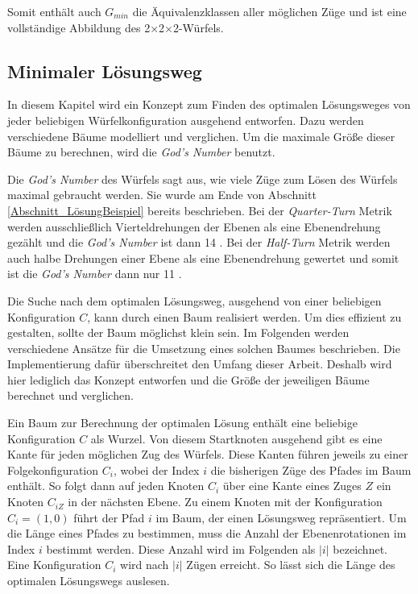 \documentclass[12pt,a4paper, usenames, dvipsnames]{article}
\theoremstyle{mystyle}
\theoremstyle{definition}
\newcommand{\Ttwo}{2$\times$2$\times$2-}
\begin{document}
Somit enthält auch $G_{min}$ die Äquivalenzklassen aller möglichen Züge und ist eine vollständige Abbildung des \Ttwo Würfels.

%
%
%
%
%
%
%
%
%
%
%
%
%
%
%
%
%
%
\subsection{Minimaler Lösungsweg}

\label{Abschnitt_MinLösung}

In diesem Kapitel wird ein Konzept zum Finden des optimalen Lösungsweges von jeder beliebigen Würfelkonfiguration ausgehend entworfen. Dazu werden verschiedene Bäume modelliert und verglichen. Um die maximale Größe dieser Bäume zu berechnen, wird die \textit{God's Number} benutzt. 

Die \textit{God's Number} des Würfels sagt aus, wie viele Züge zum Lösen des Würfels maximal gebraucht werden. Sie wurde am Ende von Abschnitt \ref{Abschnitt_LösungBeispiel} bereits beschrieben. Bei der \textit{Quarter-Turn} Metrik werden ausschließlich Vierteldrehungen der Ebenen als eine Ebenendrehung gezählt und die \textit{God's Number} ist dann 14 \cite{DJ}. Bei der \textit{Half-Turn} Metrik werden auch halbe Drehungen einer Ebene als eine Ebenendrehung gewertet und somit ist die \textit{God's Number} dann nur 11 \cite{RMG}.

Die Suche nach dem optimalen Lösungsweg, ausgehend von einer beliebigen Konfiguration $C$, kann durch einen Baum realisiert werden. Um dies effizient zu gestalten, sollte der Baum möglichst klein sein. Im Folgenden werden verschiedene Ansätze für die Umsetzung eines solchen Baumes beschrieben. Die Implementierung dafür überschreitet den Umfang dieser Arbeit. Deshalb wird hier lediglich das Konzept entworfen und die Größe der jeweiligen Bäume berechnet und verglichen. 

Ein Baum zur Berechnung der optimalen Lösung enthält eine beliebige Konfiguration $C$ als Wurzel. Von diesem Startknoten ausgehend gibt es eine Kante für jeden möglichen Zug des Würfels. Diese Kanten führen jeweils zu einer Folgekonfiguration $C_i$, wobei der Index $i$ die bisherigen Züge des Pfades im Baum enthält. So folgt dann auf jeden Knoten $C_i$ über eine Kante eines Zuges $Z$ ein Knoten $C_{iZ}$ in der nächsten Ebene. Zu einem Knoten mit der Konfiguration $C_i=(1,0)$ führt der Pfad $i$ im Baum, der einen Lösungsweg repräsentiert. Um die Länge eines Pfades zu bestimmen, muss die Anzahl der Ebenenrotationen im Index $i$ bestimmt werden. Diese Anzahl wird im Folgenden als $|i|$ bezeichnet. Eine Konfiguration $C_i$ wird nach $|i|$ Zügen erreicht. So lässt sich die Länge des optimalen Lösungswegs auslesen.
\end{document}
